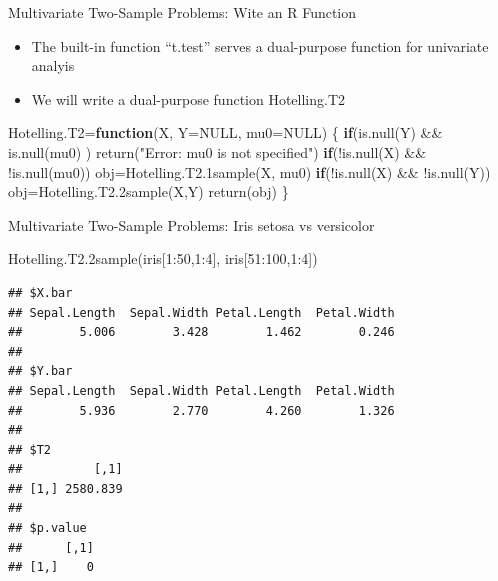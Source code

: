 \documentclass[
  ignorenonframetext,
]{beamer}
\newenvironment{Shaded}{\begin{snugshade}}{\end{snugshade}}
\newcommand{\AttributeTok}[1]{\textcolor[rgb]{0.77,0.63,0.00}{#1}}
\newcommand{\ConstantTok}[1]{\textcolor[rgb]{0.00,0.00,0.00}{#1}}
\newcommand{\ControlFlowTok}[1]{\textcolor[rgb]{0.13,0.29,0.53}{\textbf{#1}}}
\newcommand{\DecValTok}[1]{\textcolor[rgb]{0.00,0.00,0.81}{#1}}
\newcommand{\FunctionTok}[1]{\textcolor[rgb]{0.00,0.00,0.00}{#1}}
\newcommand{\NormalTok}[1]{#1}
\newcommand{\OtherTok}[1]{\textcolor[rgb]{0.56,0.35,0.01}{#1}}
\newcommand{\SpecialCharTok}[1]{\textcolor[rgb]{0.00,0.00,0.00}{#1}}
\newcommand{\StringTok}[1]{\textcolor[rgb]{0.31,0.60,0.02}{#1}}
\providecommand{\tightlist}{%
  \setlength{\itemsep}{0pt}\setlength{\parskip}{0pt}}
\begin{document}
\begin{frame}[fragile]{Multivariate Two-Sample Problems: Wite an R
Function}
\protect\hypertarget{multivariate-two-sample-problems-wite-an-r-function}{}
\begin{itemize}
\tightlist
\item
  The built-in function ``t.test'' serves a dual-purpose function for
  univariate analyis
\item
  We will write a dual-purpose function Hotelling.T2
\end{itemize}

\begin{Shaded}
\begin{Highlighting}[]
\NormalTok{Hotelling.T2}\OtherTok{=}\ControlFlowTok{function}\NormalTok{(X, }\AttributeTok{Y=}\ConstantTok{NULL}\NormalTok{, }\AttributeTok{mu0=}\ConstantTok{NULL}\NormalTok{)}
\NormalTok{\{}
 \ControlFlowTok{if}\NormalTok{(}\FunctionTok{is.null}\NormalTok{(Y) }\SpecialCharTok{\&\&} \FunctionTok{is.null}\NormalTok{(mu0) ) }
   \FunctionTok{return}\NormalTok{(}\StringTok{"Error: mu0 is not specified"}\NormalTok{)}
 \ControlFlowTok{if}\NormalTok{(}\SpecialCharTok{!}\FunctionTok{is.null}\NormalTok{(X) }\SpecialCharTok{\&\&} \SpecialCharTok{!}\FunctionTok{is.null}\NormalTok{(mu0)) }
\NormalTok{   obj}\OtherTok{=}\FunctionTok{Hotelling.T2.1sample}\NormalTok{(X, mu0) }
 \ControlFlowTok{if}\NormalTok{(}\SpecialCharTok{!}\FunctionTok{is.null}\NormalTok{(X) }\SpecialCharTok{\&\&} \SpecialCharTok{!}\FunctionTok{is.null}\NormalTok{(Y)) }
\NormalTok{   obj}\OtherTok{=}\FunctionTok{Hotelling.T2.2sample}\NormalTok{(X,Y)}
 \FunctionTok{return}\NormalTok{(obj)}
\NormalTok{\} }
\end{Highlighting}
\end{Shaded}
\end{frame}

\begin{frame}[fragile]{Multivariate Two-Sample Problems: Iris setosa vs
versicolor}
\protect\hypertarget{multivariate-two-sample-problems-iris-setosa-vs-versicolor}{}
\tiny

\begin{Shaded}
\begin{Highlighting}[]
\FunctionTok{Hotelling.T2.2sample}\NormalTok{(iris[}\DecValTok{1}\SpecialCharTok{:}\DecValTok{50}\NormalTok{,}\DecValTok{1}\SpecialCharTok{:}\DecValTok{4}\NormalTok{], iris[}\DecValTok{51}\SpecialCharTok{:}\DecValTok{100}\NormalTok{,}\DecValTok{1}\SpecialCharTok{:}\DecValTok{4}\NormalTok{])}
\end{Highlighting}
\end{Shaded}

\begin{verbatim}
## $X.bar
## Sepal.Length  Sepal.Width Petal.Length  Petal.Width 
##        5.006        3.428        1.462        0.246 
## 
## $Y.bar
## Sepal.Length  Sepal.Width Petal.Length  Petal.Width 
##        5.936        2.770        4.260        1.326 
## 
## $T2
##          [,1]
## [1,] 2580.839
## 
## $p.value
##      [,1]
## [1,]    0
\end{verbatim}

\normalsize
\end{frame}
\end{document}
